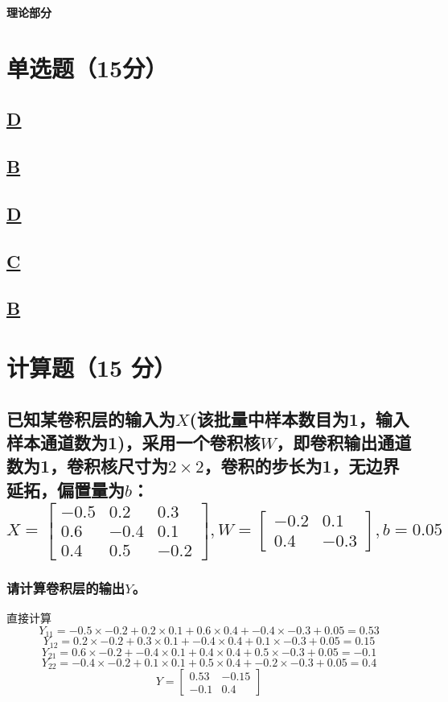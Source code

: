\documentclass[a4paper]{article}
\begin{document}
\courseheader
{}
\vspace{3mm}
\centerline{\textbf{\Large{理论部分}}}

\section{单选题（15分）}
\subsection{\underline{D}}

\subsection{\underline{B}}

\subsection{\underline{D}}

\subsection{\underline{C}}

\subsection{\underline{B}}

\section{计算题（15 分）}
\subsection{
已知某卷积层的输入为$X$(该批量中样本数目为1，输入样本通道数为1)，采用一个卷积核$W$，即卷积输出通道数为1，卷积核尺寸为$2\times 2$，卷积的步长为1，无边界延拓，偏置量为$b$：
$$X=\left[ \begin{array}{ccc}
    -0.5 & 0.2 & 0.3 \\
    0.6 & -0.4 & 0.1 \\
    0.4 & 0.5 & -0.2
\end{array}\right],
W=\left[ \begin{array}{cc}
    -0.2 & 0.1  \\
    0.4 & -0.3
\end{array}\right], b=0.05$$
}
\subsubsection{请计算卷积层的输出$Y$。}
直接计算
$$ Y_{11} = -0.5\times-0.2 + 0.2\times0.1 + 0.6\times0.4 + -0.4\times-0.3 + 0.05 = 0.53 $$
$$ Y_{12} = 0.2\times-0.2 + 0.3\times0.1 + -0.4\times0.4 + 0.1\times-0.3 + 0.05 = 0.15 $$
$$ Y_{21} = 0.6\times-0.2 + -0.4\times0.1 + 0.4\times0.4 + 0.5\times-0.3 + 0.05 = -0.1 $$
$$ Y_{22} = -0.4\times-0.2 + 0.1\times0.1 + 0.5\times0.4 + -0.2\times-0.3 + 0.05 = 0.4 $$
$$ Y=\left[ \begin{array}{cc}
    0.53 & -0.15 \\
    -0.1 & 0.4
\end{array}
\right]
$$
\end{document}
